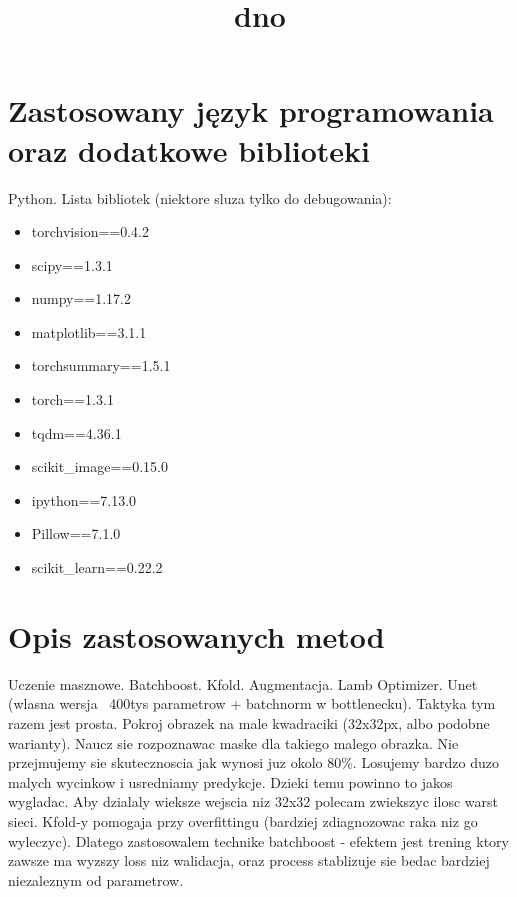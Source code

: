 \documentclass{bmvc2k}
\title{dno}
\begin{document}
\maketitle


\section{Zastosowany język programowania oraz dodatkowe biblioteki}

Python. Lista bibliotek (niektore sluza tylko do debugowania):

\begin{multicols}{3}
\begin{itemize}
\item torchvision==0.4.2
\item scipy==1.3.1
\item numpy==1.17.2
\item matplotlib==3.1.1
\item torchsummary==1.5.1
\item torch==1.3.1
\item tqdm==4.36.1
\item scikit\_image==0.15.0
\item ipython==7.13.0
\item Pillow==7.1.0
\item scikit\_learn==0.22.2
\end{itemize}
\end{multicols}

\section{Opis zastosowanych metod}

Uczenie masznowe. Batchboost. Kfold. Augmentacja. Lamb Optimizer. Unet (wlasna
wersja ~400tys parametrow + batchnorm w bottlenecku). Taktyka tym razem jest
prosta. Pokroj obrazek na male kwadraciki (32x32px, albo podobne warianty).
Naucz sie rozpoznawac maske dla takiego malego obrazka. Nie przejmujemy sie
skutecznoscia jak wynosi juz okolo 80\%. Losujemy bardzo duzo malych wycinkow i usredniamy predykcje. Dzieki temu powinno
to jakos wygladac. Aby dzialaly wieksze wejscia niz 32x32 polecam zwiekszyc ilosc
warst sieci. Kfold-y pomogaja przy overfittingu (bardziej zdiagnozowac
raka niz go wyleczyc). Dlatego zastosowalem technike batchboost - efektem
jest
trening ktory zawsze ma wyzszy loss niz walidacja, oraz process stablizuje sie bedac bardziej
niezaleznym od parametrow.
\end{document}
